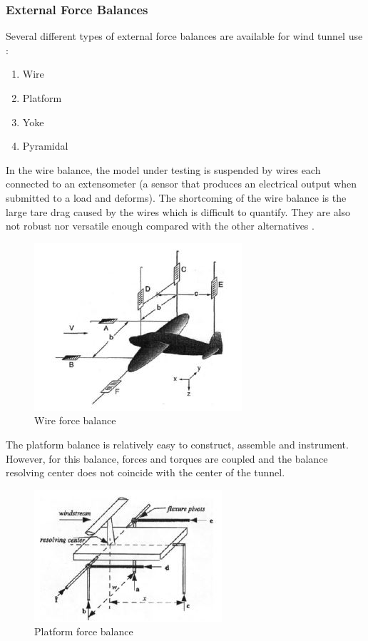 \subsubsection{External Force Balances}
Several different types of external force balances are available for wind tunnel use
\cite{morris_force_2010}:
\begin{enumerate}
\item Wire
\item Platform
\item Yoke
\item Pyramidal
\end{enumerate}
In the wire balance, the model under testing is suspended by wires each connected to an extensometer (a sensor that produces an electrical output when submitted to a load and deforms). The shortcoming of the wire balance is the large tare drag caused by the wires which is difficult to quantify. They are also not robust nor versatile enough compared with the other alternatives \cite{ferreira2015design}. 
\begin{center}
	\begin{figure}[H]
	\centering
	\includegraphics{Figures/Wire}
	\caption[Wire force balance]{Wire force balance \cite{ferreira2015design}}
	\end{figure}
\end{center}
The platform balance is relatively easy to construct, assemble and instrument. However, for this balance, forces and torques are coupled and the balance resolving center does not coincide with the center of the tunnel.
\begin{center}
	\begin{figure}[H]
	\centering
	\includegraphics{Figures/platform}
	\caption[Platform force balance]{Platform force balance \cite{ferreira2015design}}
	\end{figure}
\end{center}
